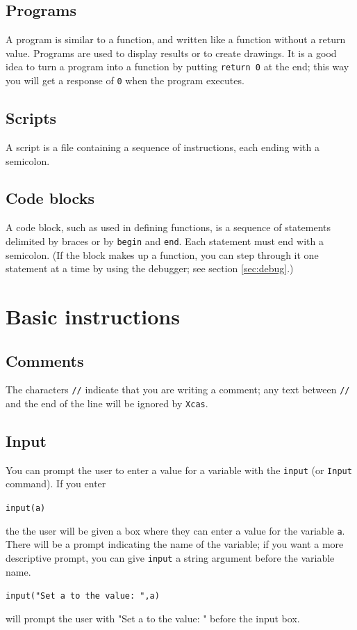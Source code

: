 \documentclass[a4paper,11pt]{book}
\begin{document}
\subsection{Programs}

A program is similar to a function, and written like a
function without a return value.  Programs are used to display results
or to create drawings.  It is a good idea to turn a program into a
function by putting \texttt{return 0} at the end; this way you will
get a response of \texttt{0} when the program executes.

\subsection{Scripts}

A script is a file containing a sequence of instructions, each ending
with a semicolon.

\subsection{Code blocks}

A code block, such as used in defining functions, is a sequence of
statements delimited by braces or by \texttt{begin} and
\texttt{end}.  Each statement must end with a semicolon.
(If the block makes up a function, you can step through it one
statement at a time by using the debugger; see section
\ref{sec:debug}.)

\section{Basic instructions}

\subsection{Comments}

The characters \texttt{//} indicate that you are writing a comment;
any text between \texttt{//} and the end of the line will be ignored
by \texttt{Xcas}.

\subsection{Input}

You can prompt the user to enter a value for a variable with the
\texttt{input} (or \texttt{Input} command).  If you enter
\begin{center}
{\tt input(a)}
\end{center}
the the user will be given a box where they can enter a value for the
variable \texttt{a}.    There will be a prompt
indicating the name of the variable; if you want a more descriptive
prompt, you can give \texttt{input} a string argument before the
variable name.
\begin{center}
{\tt input("Set a to the value: ",a)}
\end{center}
will prompt the user with "Set a to the value: " before the input box.
\end{document}
